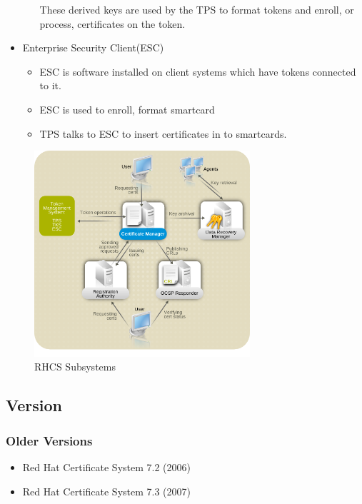 \documentclass[a4paper]{article}
\begin{document}
\begin{itemize}
\begin{itemize}
                    These derived keys are used by the TPS to format tokens and enroll, or process, certificates on the token.
            \end{itemize}
        \item Enterprise Security Client(ESC)
            \begin{itemize}
                \item ESC is software installed on client systems which have tokens connected to it.
                \item ESC is used to enroll, format smartcard 
                \item TPS talks to ESC to insert certificates in to smartcards.
            \end{itemize}
    \end{itemize}
    \begin{figure}[H]
        \centering
        \includegraphics[width=80mm]{rhcs-subsystem-overview.png}
        \caption{RHCS Subsystems ~\cite{RedHat:CSoverview}}
    \end{figure}
\subsection{Version}
    \subsubsection{Older Versions}
        \begin{itemize}
            \item Red Hat Certificate System 7.2 (2006) 
            \item Red Hat Certificate System 7.3 (2007)
        \end{itemize}
\end{document}
